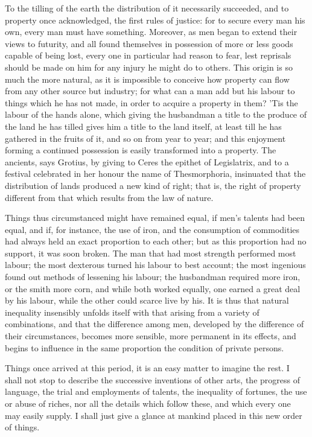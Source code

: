 \documentclass[11pt,twocolumn]{ltugboat}
\begin{document}
To the tilling of the earth the distribution of it necessarily
succeeded, and to property once acknowledged, the first rules of
justice: for to secure every man his own, every man must have
something. Moreover, as men began to extend their views to futurity,
and all found themselves in possession of more or less goods capable
of being lost, every one in particular had reason to fear, lest
reprisals should be made on him for any injury he might do to others.
This origin is so much the more natural, as it is impossible to
conceive how property can flow from any other source but industry; for
what can a man add but his labour to things which he has not made, in
order to acquire a property in them? 'Tis the labour of the hands
alone, which giving the husbandman a title to the produce of the land
he has tilled gives him a title to the land itself, at least till he
has gathered in the fruits of it, and so on from year to year; and
this enjoyment forming a continued possession is easily transformed
into a property. The ancients, says Grotius, by giving to Ceres the
epithet of Legislatrix, and to a festival celebrated in her honour the
name of Thesmorphoria, insinuated that the distribution of lands
produced a new kind of right; that is, the right of property different
from that which results from the law of nature.

Things thus circumstanced might have remained equal, if men's talents
had been equal, and if, for instance, the use of iron, and the
consumption of commodities had always held an exact proportion to each
other; but as this proportion had no support, it was soon broken. The
man that had most strength performed most labour; the most dexterous
turned his labour to best account; the most ingenious found out
methods of lessening his labour; the husbandman required more iron, or
the smith more corn, and while both worked equally, one earned a great
deal by his labour, while the other could scarce live by his. It is
thus that natural inequality insensibly unfolds itself with that
arising from a variety of combinations, and that the difference among
men, developed by the difference of their circumstances, becomes more
sensible, more permanent in its effects, and begins to influence in
the same proportion the condition of private persons.

Things once arrived at this period, it is an easy matter to imagine
the rest. I shall not stop to describe the successive inventions of
other arts, the progress of language, the trial and employments of
talents, the inequality of fortunes, the use or abuse of riches, nor
all the details which follow these, and which every one may easily
supply. I shall just give a glance at mankind placed in this new order
of things.
\end{document}
